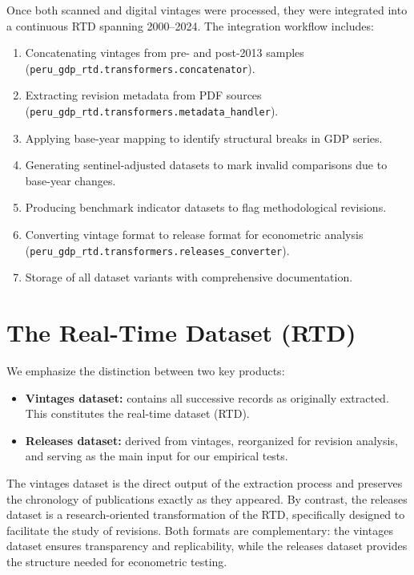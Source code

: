 \documentclass[a4paper, fleqn, 11pt]{article}
\newcommand{\pymodule}[1]{\texttt{#1}}
\begin{document}
\newpage
Once both scanned and digital vintages were processed, they were integrated into a continuous RTD spanning 2000–2024. The integration workflow includes:
%
\begin{enumerate}
    \item Concatenating vintages from pre- and post-2013 samples (\pymodule{peru\_gdp\_rtd.transformers.concatenator}).
    \item Extracting revision metadata from PDF sources (\pymodule{peru\_gdp\_rtd.transformers.metadata\_handler}).
    \item Applying base-year mapping to identify structural breaks in GDP series.
    \item Generating sentinel-adjusted datasets to mark invalid comparisons due to base-year changes.
    \item Producing benchmark indicator datasets to flag methodological revisions.
    \item Converting vintage format to release format for econometric analysis (\pymodule{peru\_gdp\_rtd.transformers.releases\_converter}).
    \item Storage of all dataset variants with comprehensive documentation.
\end{enumerate}







\section{The Real-Time Dataset (RTD)}
\label{section:rtd}
We emphasize the distinction between two key products:

\begin{itemize}
    \item \textbf{Vintages dataset:} contains all successive records as originally extracted. This constitutes the real-time dataset (RTD).
    \item \textbf{Releases dataset:} derived from vintages, reorganized for revision analysis, and serving as the main input for our empirical tests.
\end{itemize}

The vintages dataset is the direct output of the extraction process and preserves the chronology of publications exactly as they appeared. By contrast, the releases dataset is a research-oriented transformation of the RTD, specifically designed to facilitate the study of revisions. Both formats are complementary: the vintages dataset ensures transparency and replicability, while the releases dataset provides the structure needed for econometric testing.
\end{document}
